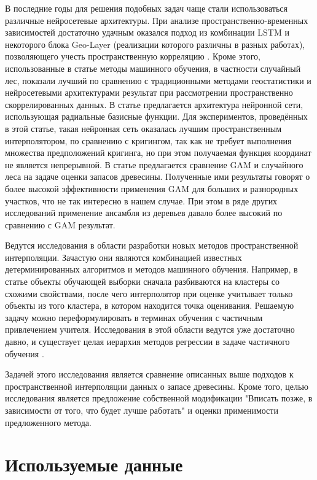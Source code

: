 \documentclass{article}
\begin{document}
В последние годы для решения подобных задач чаще стали использоваться различные нейросетевые архитектуры. При анализе пространственно-временных зависимостей достаточно удачным оказался подход из комбинации LSTM и некоторого блока Geo-Layer (реализации которого различны в разных работах), позволяющего учесть пространственную корреляцию \citep{sanchez2019growing, MA2019117729, maack2016modelling}. Кроме этого, использованные в статье \cite{MA2019117729} методы машинного обучения, в частности случайный лес, показали лучший по сравнению с традиционными методами геостатистики и нейросетевыми архитектурами результат при рассмотрении пространственно скоррелированных данных. В статье \citep{LIU2011568} предлагается архитектура нейронной сети, использующая радиальные базисные функции. Для экспериментов, проведённых в этой статье, такая нейронная сеть оказалась лучшим пространственным интерполятором, по сравнению с кригингом, так как не требует выполнения множества предположений кригинга, но при этом получаемая функция координат не является непрерывной. В статье \cite{maack2016modelling} предлагается сравнение GAM и случайного леса на задаче оценки запасов древесины. Полученные ими результаты говорят о более высокой эффективности применения GAM для больших и разнородных участков, что не так интересно в нашем случае. При этом в ряде других исследований применение ансамбля из деревьев давало более высокий по сравнению с GAM результат.

Ведутся исследования в области разработки новых методов пространственной интерполяции. Зачастую они являются комбинацией известных детерминированных алгоритмов и методов машинного обучения. Например, в статье \cite{kataev2013classification} объекты обучающей выборки сначала разбиваются на кластеры со схожими свойствами, после чего интерполятор при оценке учитывает только объекты из того кластера, в котором находится точка оценивания.
Решаемую задачу можно переформулировать в терминах обучения с частичным привлечением учителя. Исследования в этой области ведутся уже достаточно давно, и существует целая иерархия методов регрессии в задаче частичного обучения \citep{Kostopoulos2018, Xu2021SSR}.


Задачей этого исследования является сравнение описанных выше подходов к пространственной интерполяции данных о запасе древесины. Кроме того, целью исследования является предложение собственной модификации "Вписать позже, в зависимости от того, что будет лучше работать" и оценки применимости предложенного метода.

\section{Используемые данные}
\end{document}
